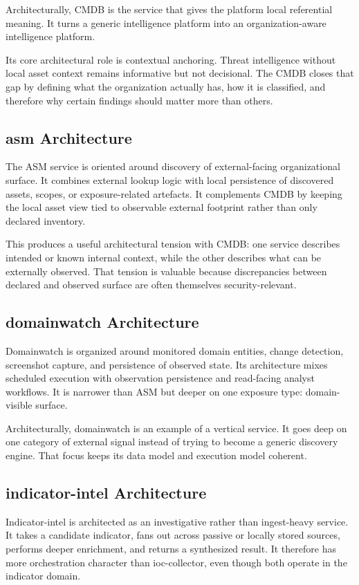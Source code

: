 Architecturally, CMDB is the service that gives the platform local referential meaning. It turns a generic intelligence platform into an organization-aware intelligence platform.

Its core architectural role is contextual anchoring. Threat intelligence without local asset context remains informative but not decisional. The CMDB closes that gap by defining what the organization actually has, how it is classified, and therefore why certain findings should matter more than others.

\subsection{asm Architecture}
The ASM service is oriented around discovery of external-facing organizational surface. It combines external lookup logic with local persistence of discovered assets, scopes, or exposure-related artefacts. It complements CMDB by keeping the local asset view tied to observable external footprint rather than only declared inventory.

This produces a useful architectural tension with CMDB: one service describes intended or known internal context, while the other describes what can be externally observed. That tension is valuable because discrepancies between declared and observed surface are often themselves security-relevant.

\subsection{domainwatch Architecture}
Domainwatch is organized around monitored domain entities, change detection, screenshot capture, and persistence of observed state. Its architecture mixes scheduled execution with observation persistence and read-facing analyst workflows. It is narrower than ASM but deeper on one exposure type: domain-visible surface.

Architecturally, domainwatch is an example of a vertical service. It goes deep on one category of external signal instead of trying to become a generic discovery engine. That focus keeps its data model and execution model coherent.

\subsection{indicator-intel Architecture}
Indicator-intel is architected as an investigative rather than ingest-heavy service. It takes a candidate indicator, fans out across passive or locally stored sources, performs deeper enrichment, and returns a synthesized result. It therefore has more orchestration character than ioc-collector, even though both operate in the indicator domain.


